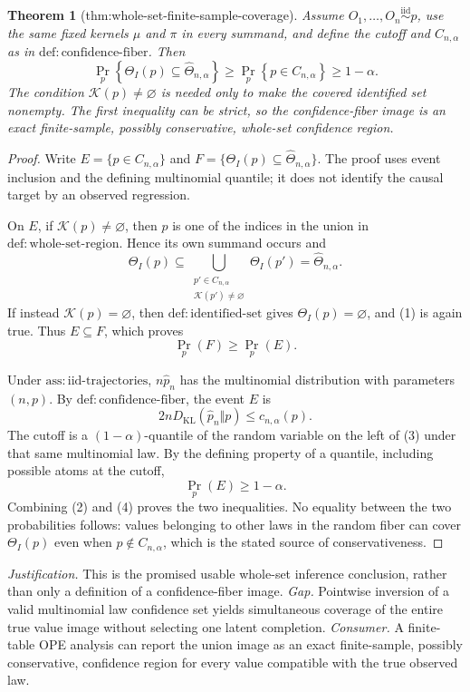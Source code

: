 \documentclass{article}
\newtheorem{theorem}{Theorem}
\begin{document}
\begin{theorem}[thm:whole-set-finite-sample-coverage]\label{thm:whole-set-finite-sample-coverage}
Assume \(O_1,\ldots,O_n\overset{\mathrm{iid}}{\sim}p\), use the same fixed kernels \(\mu\) and \(\pi\) in every summand, and define the cutoff and \(C_{n,\alpha}\) as in \(\mathrm{def{:}confidence\text{-}fiber}\). Then
\[
\Pr_p\!\left\{\Theta_I(p)\subseteq\widehat\Theta_{n,\alpha}\right\}
\geq \Pr_p\!\left\{p\in C_{n,\alpha}\right\}
\geq 1-\alpha.
\]
The condition \(\mathcal K(p)\ne\varnothing\) is needed only to make the covered identified set nonempty. The first inequality can be strict, so the confidence-fiber image is an exact finite-sample, possibly conservative, whole-set confidence region.
\end{theorem}
\begin{proof}
Write \(E=\{p\in C_{n,\alpha}\}\) and \(F=\{\Theta_I(p)\subseteq\widehat\Theta_{n,\alpha}\}\). The proof uses event inclusion and the defining multinomial quantile; it does not identify the causal target by an observed regression.

On \(E\), if \(\mathcal K(p)\ne\varnothing\), then \(p\) is one of the indices in the union in \(\mathrm{def{:}whole\text{-}set\text{-}region}\). Hence its own summand occurs and
\[
\Theta_I(p)\subseteq
\bigcup_{\substack{p'\in C_{n,\alpha}\\\mathcal K(p')\ne\varnothing}}
\Theta_I(p')=\widehat\Theta_{n,\alpha}.
\tag{1}
\]
If instead \(\mathcal K(p)=\varnothing\), then \(\mathrm{def{:}identified\text{-}set}\) gives \(\Theta_I(p)=\varnothing\), and (1) is again true. Thus \(E\subseteq F\), which proves
\[
\Pr_p(F)\geq\Pr_p(E).
\tag{2}
\]

Under \(\mathrm{ass{:}iid\text{-}trajectories}\), \(n\widehat p_n\) has the multinomial distribution with parameters \((n,p)\). By \(\mathrm{def{:}confidence\text{-}fiber}\), the event \(E\) is
\[
2nD_{\mathrm{KL}}(\widehat p_n\Vert p)\leq c_{n,\alpha}(p).
\tag{3}
\]
The cutoff is a \((1-\alpha)\)-quantile of the random variable on the left of (3) under that same multinomial law. By the defining property of a quantile, including possible atoms at the cutoff,
\[
\Pr_p(E)\geq1-\alpha.
\tag{4}
\]
Combining (2) and (4) proves the two inequalities. No equality between the two probabilities follows: values belonging to other laws in the random fiber can cover \(\Theta_I(p)\) even when \(p\notin C_{n,\alpha}\), which is the stated source of conservativeness.
\end{proof}
\par\smallskip\noindent \textit{Justification.} This is the promised usable whole-set inference conclusion, rather than only a definition of a confidence-fiber image. \textit{Gap.} Pointwise inversion of a valid multinomial law confidence set yields simultaneous coverage of the entire true value image without selecting one latent completion. \textit{Consumer.} A finite-table OPE analysis can report the union image as an exact finite-sample, possibly conservative, confidence region for every value compatible with the true observed law.
\end{document}
